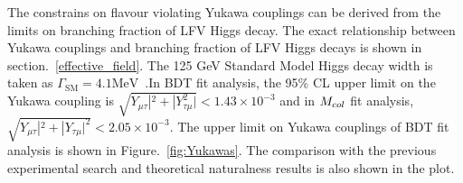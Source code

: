 The constrains on flavour violating Yukawa couplings can be derived from the limits on branching fraction of  LFV Higgs decay. The exact relationship between Yukawa couplings and branching fraction of LFV Higgs decays is shown in section.~\ref{effective_field}. The 125 GeV Standard Model Higgs  decay width is taken as $\Gamma_{\mathrm{SM}}=4.1\textrm{MeV}$~\cite{Denner:2011mq}.In BDT fit analysis, the 95\% CL upper limit on the Yukawa coupling is $\sqrt{Y_{\mu\tau}|^2 + |Y_{\tau\mu}^2|}<1.43\times 10^{-3}$ and in $M_{col}$ fit analysis, $\sqrt{Y_{\mu\tau}|^2 + |Y_{\tau\mu}|^2}<2.05\times 10^{-3}$. The upper limit on Yukawa couplings of BDT fit analysis is shown in Figure.~\ref{fig:Yukawas}. The comparison with the previous experimental search and theoretical naturalness results is also shown in the plot. 


\begin{figure}[htbp] 
     \centering
     \\

\end{figure}
